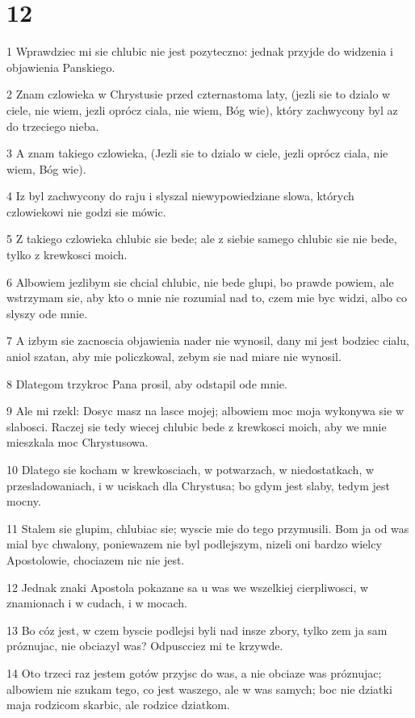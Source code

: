 \chapter{12}

\par 1 Wprawdziec mi sie chlubic nie jest pozyteczno: jednak przyjde do widzenia i objawienia Panskiego.
\par 2 Znam czlowieka w Chrystusie przed czternastoma laty, (jezli sie to dzialo w ciele, nie wiem, jezli oprócz ciala, nie wiem, Bóg wie), który zachwycony byl az do trzeciego nieba.
\par 3 A znam takiego czlowieka, (Jezli sie to dzialo w ciele, jezli oprócz ciala, nie wiem, Bóg wie).
\par 4 Iz byl zachwycony do raju i slyszal niewypowiedziane slowa, których czlowiekowi nie godzi sie mówic.
\par 5 Z takiego czlowieka chlubic sie bede; ale z siebie samego chlubic sie nie bede, tylko z krewkosci moich.
\par 6 Albowiem jezlibym sie chcial chlubic, nie bede glupi, bo prawde powiem, ale wstrzymam sie, aby kto o mnie nie rozumial nad to, czem mie byc widzi, albo co slyszy ode mnie.
\par 7 A izbym sie zacnoscia objawienia nader nie wynosil, dany mi jest bodziec cialu, aniol szatan, aby mie policzkowal, zebym sie nad miare nie wynosil.
\par 8 Dlategom trzykroc Pana prosil, aby odstapil ode mnie.
\par 9 Ale mi rzekl: Dosyc masz na lasce mojej; albowiem moc moja wykonywa sie w slabosci. Raczej sie tedy wiecej chlubic bede z krewkosci moich, aby we mnie mieszkala moc Chrystusowa.
\par 10 Dlatego sie kocham w krewkosciach, w potwarzach, w niedostatkach, w przesladowaniach, i w uciskach dla Chrystusa; bo gdym jest slaby, tedym jest mocny.
\par 11 Stalem sie glupim, chlubiac sie; wyscie mie do tego przymusili. Bom ja od was mial byc chwalony, poniewazem nie byl podlejszym, nizeli oni bardzo wielcy Apostolowie, chociazem nic nie jest.
\par 12 Jednak znaki Apostola pokazane sa u was we wszelkiej cierpliwosci, w znamionach i w cudach, i w mocach.
\par 13 Bo cóz jest, w czem byscie podlejsi byli nad insze zbory, tylko zem ja sam próznujac, nie obciazyl was? Odpuscciez mi te krzywde.
\par 14 Oto trzeci raz jestem gotów przyjsc do was, a nie obciaze was próznujac; albowiem nie szukam tego, co jest waszego, ale w was samych; boc nie dziatki maja rodzicom skarbic, ale rodzice dziatkom.
